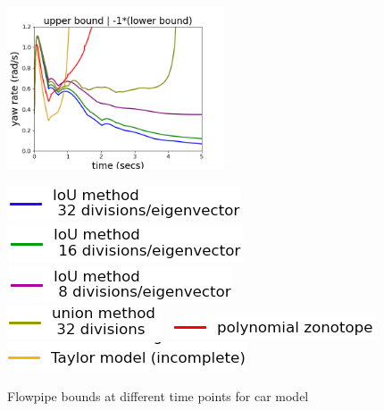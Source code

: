 \begin{figure}
\includegraphics[width=6.4cm,height=4.8cm]{autocarImages/ubToolYawRate.png}


\includegraphics[scale = 0.39]{autocarImages/leg1.png}~
  \includegraphics[scale = 0.41]{autocarImages/leg2.png}~
  \includegraphics[scale = 0.41]{autocarImages/leg3.png}
\includegraphics[scale = 0.39]{autocarImages/leg6.png}~
  \includegraphics[scale = 0.41]{autocarImages/leg5.png}~
  \includegraphics[scale = 0.41]{autocarImages/leg4.png}
  \caption{Flowpipe bounds at different time points for
    car model }\label{fig:flowcar}
\end{figure}


